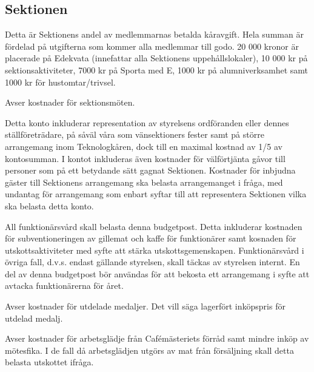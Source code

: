 \documentclass[10pt]{article}
\begin{document}
\subsection*{Sektionen}
\titlerule[0.5pt]
\begin{description}[style=multiline, leftmargin=60mm]

\item[SEK01, Sektionsavgifter]
Detta är Sektionens andel av medlemmarnas betalda kåravgift. Hela summan är fördelad på utgifterna som kommer alla medlemmar till godo. 20 000 kronor är placerade på Edekvata (innefattar alla Sektionens uppehållslokaler), 10 000 kr på sektionsaktiviteter, 7000 kr på Sporta med E, 1000 kr på alumniverksamhet samt 1000 kr för hustomtar/trivsel.

\item[SEK01, Sektionsaktiviteter]
Avser kostnader för sektionsmöten.

\item[SEK01, Representation]
Detta konto inkluderar representation av styrelsens ordföranden eller dennes ställföreträdare, på såväl våra som vänsektioners fester samt på större arrangemang inom Teknologkåren, dock till en maximal kostnad av 1/5 av kontosumman. I kontot inkluderas även kostnader för välförtjänta gåvor till personer som på ett betydande sätt gagnat Sektionen. Kostnader för inbjudna gäster till Sektionens arrangemang ska belasta arrangemanget i fråga, med undantag för arrangemang som enbart syftar till att representera Sektionen vilka ska belasta detta konto.

\item[SEK01, Funktionärsvård]
All funktionärsvård skall belasta denna budgetpost. Detta inkluderar kostnaden för subventioneringen av gillemat och kaffe för funktionärer samt kosnaden för utskottsaktiviteter med syfte att stärka utskottsgemenskapen. Funktionärsvård i övriga fall, d.v.s. endast gällande styrelsen, skall täckas av styrelsen internt. En del av denna budgetpost bör användas för att bekosta ett arrangemang i syfte att avtacka funktionärerna för året.

\item[SEK01, Medaljer]
Avser kostnader för utdelade medaljer. Det vill säga lagerfört inköpspris för utdelad medalj.

\item[SEK01, Arbetsglädje]
Avser kostnader för arbetsglädje från Cafémästeriets förråd samt mindre inköp av mötesfika. I de fall då arbetsglädjen utgörs av mat från försäljning skall detta belasta utskottet ifråga.


\end{description}
\end{document}
